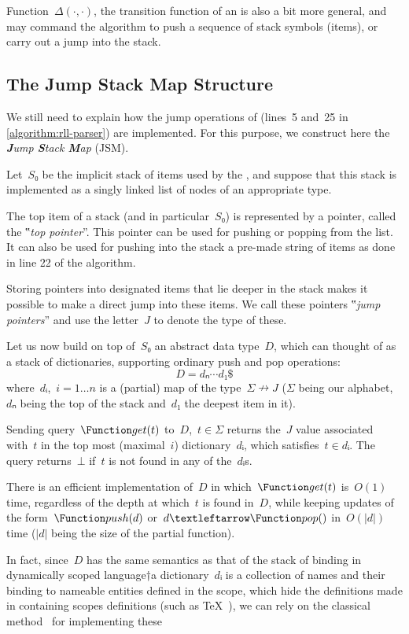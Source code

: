 Function~$Δ(·,·)$, the transition function of an \RLLp is also a bit more
general, and may command the algorithm to push a sequence of stack symbols
(items), or carry out a jump into the stack.

\subsection{The Jump Stack Map Structure}
We still need to explain how the jump operations of \RLLp (lines~5
and~25 in \cref{algorithm:rll-parser}) are implemented. For this purpose, we
construct here the \emph{\textbf Jump \textbf Stack \textbf Map} (JSM).

Let~$S₀$ be the implicit stack of items used by the \RLLp, and suppose that
this stack is implemented as a singly linked list of nodes of an appropriate
type.

The top item of a stack (and in particular~$S₀$) is represented by a pointer,
called the ‟\emph{top pointer}”. This pointer can be used for pushing or
popping from the list. It can also be used for pushing into the stack a
pre-made string of items as done in line 22 of the \RLLp algorithm.

Storing pointers into designated items that lie deeper in the stack makes it
possible to make a direct jump into these items. We call these pointers
‟\emph{jump pointers}” and use the letter~$J$ to denote the type of these.

Let us now build on top of~$S₀$ an abstract data type~$D$, which can thought of
as a stack of dictionaries, supporting ordinary push and pop operations:
\[
  D=dₙ⋯d₁\$
\]
where~$dᵢ$,~$i=1…n$ is a (partial) map of the type~$Σ↛J$ ($Σ$ being our
alphabet,~$dₙ$ being the top of the stack and~$d₁$ the deepest item in it).

Sending query~$\Function get(t)$ to~$D$,~$t∈Σ$ returns the~$J$ value
associated with~$t$ in the top most (maximal~$i$) dictionary~$dᵢ$, which
satisfies~$t∈dᵢ$. The query returns~$⊥$ if~$t$ is not found in any of
the~$dᵢ$s.

There is an efficient implementation of~$D$ in which~$\Function get(t)$
is~$O(1)$ time, regardless of the depth at which~$t$ is found in~$D$, while
keeping updates of the form~$\Function push(d)$ or~$d←\Function pop()$
in~$O(|d|)$ time ($|d|$ being the size of the partial function).

In fact, since~$D$ has the same semantics as that of the stack of binding in
dynamically scoped language†{a dictionary~$dᵢ$ is a collection of
  names and their binding to nameable entities defined in the scope, which hide
the definitions made in containing scopes} definitions (such as
\TeX~\cite{TeX:79}), we can rely on the classical method~\cite{Schoe:95} for
implementing these

